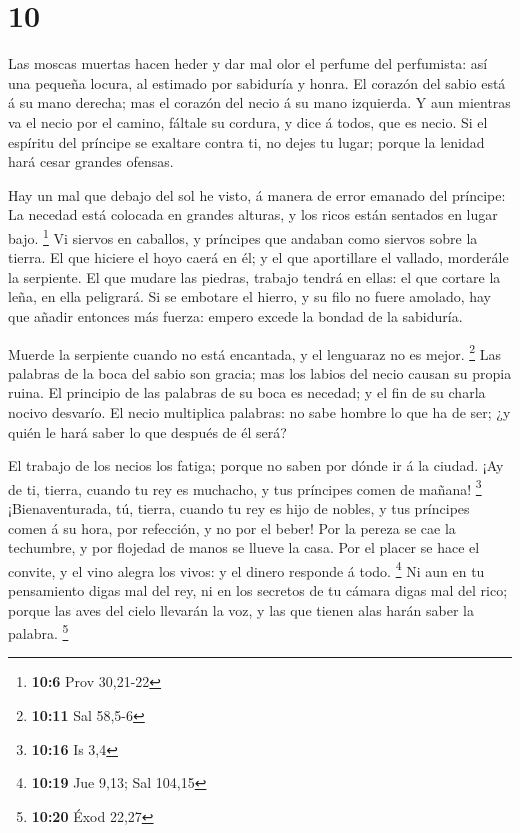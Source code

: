 \hypertarget{section-9}{%
\section{10}\label{section-9}}

 Las moscas muertas hacen heder y dar mal olor el perfume
del perfumista: así una pequeña locura, al estimado por sabiduría y
honra.  El corazón del sabio está á su mano derecha; mas
el corazón del necio á su mano izquierda.  Y aun mientras
va el necio por el camino, fáltale su cordura, y dice á todos, que es
necio.  Si el espíritu del príncipe se exaltare contra ti,
no dejes tu lugar; porque la lenidad hará cesar grandes ofensas.

 Hay un mal que debajo del sol he visto, á manera de error
emanado del príncipe:  La necedad está colocada en grandes
alturas, y los ricos están sentados en lugar bajo. \footnote{\textbf{10:6}
  Prov 30,21-22}  Vi siervos en caballos, y príncipes que
andaban como siervos sobre la tierra.  El que hiciere el
hoyo caerá en él; y el que aportillare el vallado, morderále la
serpiente.  El que mudare las piedras, trabajo tendrá en
ellas: el que cortare la leña, en ella peligrará.  Si se
embotare el hierro, y su filo no fuere amolado, hay que añadir entonces
más fuerza: empero excede la bondad de la sabiduría.

 Muerde la serpiente cuando no está encantada, y el
lenguaraz no es mejor. \footnote{\textbf{10:11} Sal 58,5-6}
 Las palabras de la boca del sabio son gracia; mas los
labios del necio causan su propia ruina.  El principio de
las palabras de su boca es necedad; y el fin de su charla nocivo
desvarío.  El necio multiplica palabras: no sabe hombre
lo que ha de ser; ¿y quién le hará saber lo que después de él será?

 El trabajo de los necios los fatiga; porque no saben por
dónde ir á la ciudad.  ¡Ay de ti, tierra, cuando tu rey
es muchacho, y tus príncipes comen de mañana! \footnote{\textbf{10:16}
  Is 3,4}  ¡Bienaventurada, tú, tierra, cuando tu rey es
hijo de nobles, y tus príncipes comen á su hora, por refección, y no por
el beber!  Por la pereza se cae la techumbre, y por
flojedad de manos se llueve la casa.  Por el placer se
hace el convite, y el vino alegra los vivos: y el dinero responde á
todo. \footnote{\textbf{10:19} Jue 9,13; Sal 104,15}  Ni
aun en tu pensamiento digas mal del rey, ni en los secretos de tu cámara
digas mal del rico; porque las aves del cielo llevarán la voz, y las que
tienen alas harán saber la palabra. \footnote{\textbf{10:20} Éxod 22,27}

